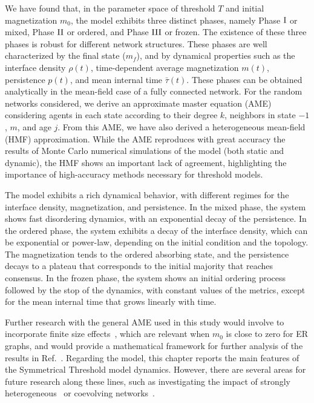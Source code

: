 We have found that, in the parameter space of threshold $T$ and initial magnetization $m_0$, the model exhibits three distinct phases, namely Phase ${\rm I}$ or mixed, Phase ${\rm II}$ or ordered, and Phase ${\rm III}$ or frozen. The existence of these three phases is robust for different network structures.
These phases are well characterized by the final state ($m_f$), and by dynamical properties such as the interface density $\rho(t)$, time-dependent average magnetization $m(t)$, persistence $p(t)$, and mean internal time $\bar{\tau}(t)$. These phases can be obtained analytically in the mean-field case of a fully connected network. For the random networks considered, we derive an approximate master equation (AME)~\cite{gleeson-2013} considering agents in each state according to their degree $k$,  neighbors in state $-1$, $m$, and age $j$. From this AME, we have also derived a heterogeneous mean-field (HMF) approximation. While the AME reproduces with great accuracy the results of Monte Carlo numerical simulations of the model (both static and dynamic), the HMF shows an important lack of agreement, highlighting the importance of high-accuracy methods necessary for threshold models.

The model exhibits a rich dynamical behavior, with different regimes for the interface density, magnetization, and persistence. In the mixed phase, the system shows fast disordering dynamics, with an exponential decay of the persistence. In the ordered phase, the system exhibits a decay of the interface density, which can be exponential or power-law, depending on the initial condition and the topology. The magnetization tends to the ordered absorbing state, and the persistence decays to a plateau that corresponds to the initial majority that reaches consensus. In the frozen phase, the system shows an initial ordering process followed by the stop of the dynamics, with constant values of the metrics, except for the mean internal time that grows linearly with time.

Further research with the general AME used in this study would involve to incorporate finite size effects~\cite{peralta-2020B}, which are relevant when $m_0$ is close to zero for ER graphs, and would provide a mathematical framework for further analysis of the results in Ref.~\cite{Pournaki-2022}. Regarding the model, this chapter reports the main features of the Symmetrical Threshold model dynamics. However, there are several areas for future research along these lines, such as investigating the impact of strongly heterogeneous~\cite{barabasi2009scale} or coevolving networks~\cite{Zimmermann,vazquez-2008}.